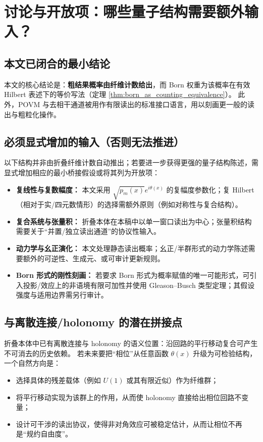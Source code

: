 \section{讨论与开放项：哪些量子结构需要额外输入？}

\subsection{本文已闭合的最小结论}

本文的核心结论是：\textbf{粗结果概率由纤维计数给出}，而 Born 权重为该概率在有效 Hilbert 表述下的等价写法（定理 \ref{thm:born_as_counting_equivalence}）。
此外，POVM 与去相干通道被用作有限读出的标准接口语言，用以刻画更一般的读出与粗粒化操作。

\subsection{必须显式增加的输入（否则无法推进）}

以下结构并非由折叠纤维计数自动推出；若要进一步获得更强的量子结构陈述，需显式增加相应的最小桥接假设或将其列为开放项：
\begin{itemize}
  \item \textbf{复线性与复数幅度：} 本文采用 $\sqrt{p_m(x)}e^{i\theta(x)}$ 的复幅度参数化；复 Hilbert（相对于实/四元数情形）的选择需额外原则（例如对称性与复合结构）。
  \item \textbf{复合系统与张量积：} 折叠本体在本稿中以单一窗口读出为中心；张量积结构需要关于“并置/独立读出通道”的协议性输入。
  \item \textbf{动力学与幺正演化：} 本文处理静态读出概率；幺正/半群形式的动力学陈述需要额外的可逆性、生成元、或可审计更新规则。
  \item \textbf{Born 形式的刚性刻画：} 若要求 Born 形式为概率赋值的唯一可能形式，可引入投影/效应上的非语境有限可加性并使用 Gleason--Busch 类型定理；其假设强度与适用边界需另行审计。
\end{itemize}

\subsection{与离散连接/holonomy 的潜在拼接点}

折叠本体中已有离散连接与 holonomy 的语义位置：沿回路的平行移动复合可产生不可消去的历史依赖。
若未来要把“相位”从任意函数 $\theta(x)$ 升级为可检验结构，一个自然方向是：
\begin{itemize}
  \item 选择具体的残差载体（例如 $U(1)$ 或其有限近似）作为纤维群；
  \item 将平行移动实现为该群上的作用，从而使 holonomy 直接给出相位回路不变量；
  \item 设计可干涉的读出协议，使得非对角效应可被稳定估计，从而让相位不再是“规约自由度”。
\end{itemize}

